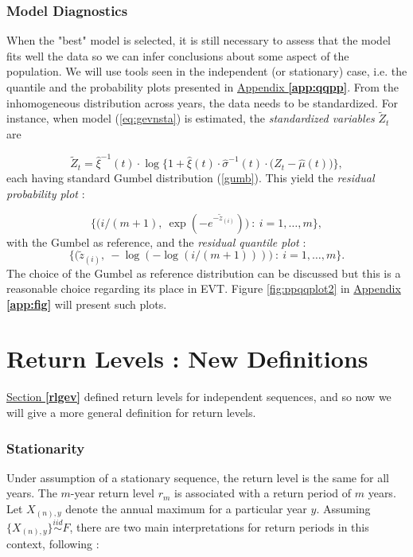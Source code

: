 \subsubsection*{Model Diagnostics}


When the "best" model is selected, it is still necessary to assess that the model fits well the data so we can infer conclusions about some aspect of the population. 
We will use tools seen in the independent (or stationary) case, i.e. the quantile and the probability plots presented in \hyperref[app:qqpp]{Appendix \textbf{\ref{app:qqpp}}}. From the inhomogeneous distribution across years, the data needs to be standardized. For instance, when model (\ref{eq:gevnsta}) is estimated, the \emph{standardized variables} $\tilde{Z}_t$ are 

\begin{equation}
\tilde{Z}_t=\hat{\xi}^{-1}(t)\cdot\log \bigg\{1+\hat{\xi}(t)\cdot \hat{\sigma}^{-1}(t)\cdot\Big(Z_t-\hat{\mu}(t)\Big)\bigg\},
\end{equation}
each having standard Gumbel distribution (\ref{gumb}). This yield the \emph{residual probability plot} :

\begin{equation}
\bigg\{\Big(i/(m+1),\  \exp(-e^{-\tilde{z}_{(i)}})\Big) \ : \ i=1,\dots,m\bigg\},
\end{equation}
with the Gumbel as reference, and the \emph{residual quantile plot} :
\begin{equation}
\bigg\{\Big(\tilde{z}_{(i)},\ -\log(-\log(i/(m+1)))\Big) \ : \ i=1,\dots,m\bigg\}.
\end{equation}
The choice of the Gumbel as reference distribution can be discussed but this is a reasonable choice regarding its place in EVT.
Figure \ref{fig:ppqqplot2} in \hyperref[app:fig]{Appendix \textbf{\ref{app:fig}}} will present such plots.


\section{Return Levels : New Definitions}\label{sec:returnlvlnstatio}

\hyperref[rlgev]{Section  \textbf{\ref{rlgev}}} defined return levels for independent sequences, and so now we will give a more general definition for return levels. 

\subsubsection*{Stationarity} 
Under assumption of a
stationary sequence, the return level is the same for all years. The $m$-year return level $r_m$ is associated with a return period of $m$ years. Let $X_{(n),y}$ denote the annual maximum for a particular year $y$. Assuming $\{X_{(n),y}\}\stackrel{iid}{\sim}F$, there are two main interpretations for return periods in this context, following \citet[chap.4]{ag_extremes_2013} :

